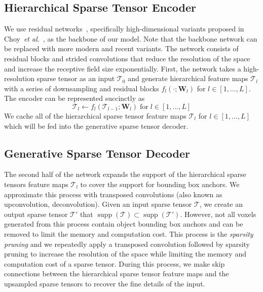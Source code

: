 \documentclass[runningheads]{llncs}
\newcommand{\etal}{\textit{et al.}}
\DeclareMathOperator\supp{supp}
\begin{document}
\subsection{Hierarchical Sparse Tensor Encoder}
\label{sec:sparse_pyramid}

We use residual networks~\cite{he2016deep}, specifically high-dimensional variants proposed in Choy~\etal~\cite{minkowskinet}, as the backbone of our model. Note that the backbone network can be replaced with more modern and recent variants. The network consists of residual blocks and strided convolutions that reduce the resolution of the space and increase the receptive field size exponentially. First, the network takes a high-resolution sparse tensor as an input $\mathscr{T}_0$ and generate hierarchical feature maps $\mathscr{T}_l$ with a series of downsampling and residual blocks $f_l(\cdot; \mathbf{W}_l)$ for $l \in [1, ..., L]$. The encoder can be represented succinctly as
$$
\mathscr{T}_l \leftarrow f_l(\mathscr{T}_{l - 1}; \mathbf{W}_l) \;\text{for}\;l\in [1,...,L]
$$
We cache all of the hierarchical sparse tensor feature maps $\mathscr{T}_l$ for $l \in [1, ..., L]$ which will be fed into the generative sparse tensor decoder.





\subsection{Generative Sparse Tensor Decoder}
\label{sec:generative_network}





The second half of the network expands the support of the hierarchical sparse tensors feature maps $\mathscr{T}_l$ to cover the support for bounding box anchors. We approximate this process with transposed convolutions (also known as upconvolution, deconvolution). Given an input sparse tensor $\mathscr{T}$, we create an output sparse tensor $\mathscr{T}'$ that $\supp(\mathscr{T}) \subset \supp(\mathscr{T}')$. However, not all voxels generated from this process contain object bounding box anchors and can be removed to limit the memory and computation cost. This process is the \textit{sparsity pruning} and we repeatedly apply a transposed convolution followed by sparsity pruning to increase the resolution of the space while limiting the memory and computation cost of a sparse tensor. During this process, we make skip connections between the hierarchical sparse tensor feature maps and the upsampled sparse tensors to recover the fine details of the input.
\end{document}
